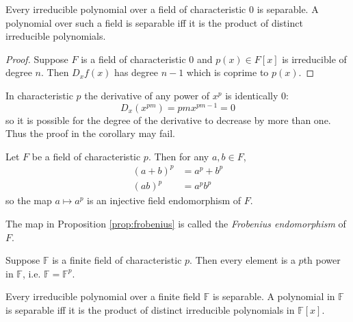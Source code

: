\documentclass[a4paper]{article}
\begin{document}
\begin{cor}
  Every irreducible polynomial over a field of characteristic $0$ is separable. A polynomial over such a field is separable iff it is the product of distinct irreducible polynomials.
\end{cor}

\begin{proof}
  Suppose $F$ is a field of characteristic $0$ and $p(x)\in F[x]$ is irreducible of degree $n$. Then $D_xf(x)$ has degree $n-1$ which is coprime to $p(x)$.
\end{proof}

\begin{rmk}
  In characteristic $p$ the derivative of any power of $x^p$ is identically $0$:
  \[ D_x(x^{pm}) = pmx^{pm-1} = 0 \]
  so it is possible for the degree of the derivative to decrease by more than one. Thus the proof in the corollary may fail.
\end{rmk}

\begin{prop}\label{prop:frobenius}
  Let $F$ be a field of characteristic $p$. Then for any $a,b\in F$,
  \begin{align*}
    (a+b)^p &= a^p+b^p\\
    (ab)^p &= a^p b^p
  \end{align*}
  so the map $a \mapsto a^p$ is an injective field endomorphism of $F$.
\end{prop}

\begin{defi}
  The map in Proposition \ref{prop:frobenius} is called the \emph{Frobenius endomorphism} of $F$.
\end{defi}

\begin{cor}\label{cor:perfect field}
  Suppose $\mathbb{F}$ is a finite field of characteristic $p$. Then every element is a $p$th power in $\mathbb F$, i.e. $\mathbb F = \mathbb F^p$.
\end{cor}

\begin{prop}
  Every irreducible polynomial over a finite field $\mathbb F$ is separable. A polynomial in $\mathbb F$ is separable iff it is the product of distinct irreducible polynomials in $\mathbb F[x]$.
\end{prop}
\end{document}
